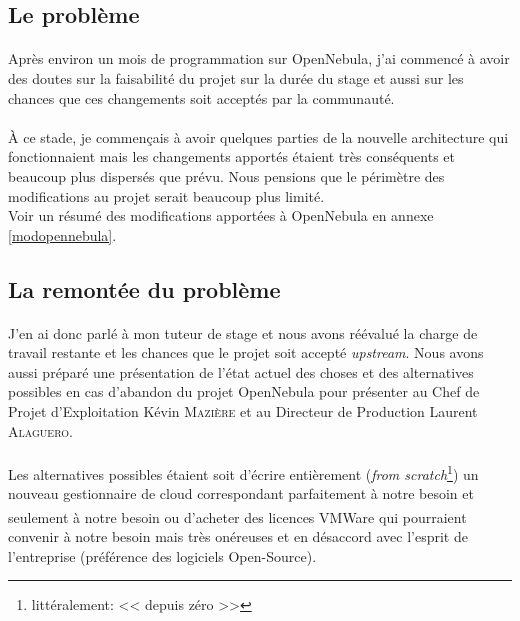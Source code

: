 \subsection{Le problème}

\paragraph*{}
Après environ un mois de programmation sur OpenNebula, j'ai commencé à avoir des doutes sur la faisabilité du projet sur la durée du stage et
aussi sur les chances que ces changements soit acceptés par la communauté.

\paragraph*{}
À ce stade, je commençais à avoir quelques parties de la nouvelle architecture qui fonctionnaient mais les changements apportés étaient très
conséquents et beaucoup plus dispersés que prévu. Nous pensions que le périmètre des modifications au projet serait beaucoup plus limité.\\
Voir un résumé des modifications apportées à OpenNebula en annexe \ref{modopennebula}.

\subsection{La remontée du problème}

\paragraph*{}
J'en ai donc parlé à mon tuteur de stage et nous avons réévalué la charge de travail restante et les chances que le projet soit accepté \emph{upstream}.
Nous avons aussi préparé une présentation de l'état actuel des choses et des alternatives possibles en cas d'abandon du projet OpenNebula pour
présenter au Chef de Projet d'Exploitation Kévin \textsc{Mazière} et au Directeur de Production Laurent \textsc{Alaguero}.

\paragraph*{}
Les alternatives possibles étaient soit d'écrire entièrement (\emph{from scratch}\footnote{littéralement: << depuis zéro >>}) un nouveau gestionnaire de
cloud correspondant parfaitement à notre besoin et seulement à notre besoin ou d'acheter des licences VMWare\textsuperscript{\textregistered} qui pourraient
convenir à notre besoin mais très onéreuses et en désaccord avec l'esprit de l'entreprise (préférence des logiciels Open-Source).

